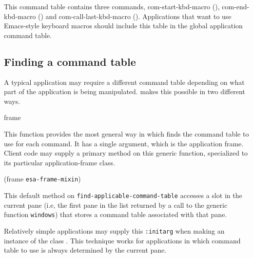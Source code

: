 This command table contains three commands, com-start-kbd-macro
(), com-end-kbd-macro () and
com-call-last-kbd-macro ().  Applications that want to use
Emacs-style keyboard macros should include this table in the global
application command table.

\subsection{Finding a command table}

A typical \sysname{} application may require a different command table
depending on what part of the application is being manipulated.
\sysname{} makes this possible in two different ways.

 {frame}

This function provides the most general way in which \sysname{} finds
the command table to use for each command.  It has a single argument,
which is the \sysname{} application frame.  Client code may supply a
primary method on this generic function, specialized to its particular
application-frame class.

 {(frame \texttt{esa-frame-mixin})}

This default method on \texttt{find-applicable-command-table} accesses
a slot in the current pane (i.e, the first pane in the list returned
by a call to the generic function \texttt{windows}) that stores a
command table associated with that pane.


Relatively simple \sysname{} applications may supply this
\texttt{:initarg} when making an instance of the class
.  This technique works for applications
in which command table to use is always determined by the current
pane.
